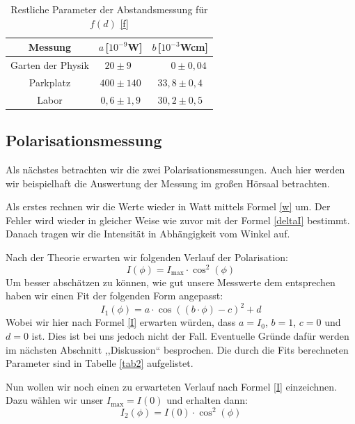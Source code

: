 \documentclass[titlepage,11pt,a4paper,ngerman]{article}
\newcommand{\tx}[1]{\textrm{#1}}
\begin{document}
\begin{table}[ht]
	\centering
	\caption{Restliche Parameter der Abstandsmessung für $f(d)$ \eqref{f}}
	\begin{tabular*}{.95\textwidth}{@{\extracolsep{\fill}}ccc}
		\toprule
		Messung & $a\,$[$ 10^{-9} $W] & $b\,$[$ 10^{-3} $Wcm] \\
		\midrule
		Garten der Physik & $20\pm9 \phantom{0}$ & $\phantom{0.00}0\pm0{,}04$ \\
		Parkplatz & $400\pm140$ & $33{,}8\pm0{,}4$\\
		Labor & $0{,}6\pm1{,}9$ & $30{,}2\pm0{,}5$ \\
		\bottomrule
	\end{tabular*}
	\label{tab1}
\end{table}

\FloatBarrier

\subsection{Polarisationsmessung}

Als nächstes betrachten wir die zwei Polarisationsmessungen. Auch hier werden wir beispielhaft die Auswertung der Messung im großen Hörsaal betrachten. \par 
Als erstes rechnen wir die Werte wieder in Watt mittels Formel \eqref{w} um. Der Fehler wird wieder in gleicher Weise wie zuvor mit der Formel \eqref{deltaI} bestimmt. Danach tragen wir die Intensität in Abhängigkeit vom Winkel auf. \par 
Nach der Theorie erwarten wir folgenden Verlauf der Polarisation:
\begin{equation}
I(\phi) = I_{\tx{max}}\cdot \cos^{2}(\phi)
\label{I}
\end{equation}
Um besser abschätzen zu können, wie gut unsere Messwerte dem entsprechen haben wir einen Fit der folgenden Form angepasst:
\begin{equation}
I_{1}(\phi) = a \cdot \cos((b \cdot\phi) - c)^{2} + d
\label{I1}
\end{equation}
Wobei wir hier nach Formel \eqref{I} erwarten würden, dass $a=I_{0}$, $b=1$, $c=0$ und $d=0$ ist. Dies ist bei uns jedoch nicht der Fall. Eventuelle Gründe dafür werden im nächsten Abschnitt ,,Diskussion`` besprochen. Die durch die Fits berechneten Parameter sind in Tabelle \ref{tab2} aufgelistet.\par
Nun wollen wir noch einen zu erwarteten Verlauf nach Formel \eqref{I} einzeichnen. Dazu wählen wir unser $I_{\tx{max}}=I(0)$ und erhalten dann:
\begin{equation}
I_{2}(\phi) = I(0)\cdot \cos^{2}(\phi)
\label{I2}
\end{equation}
\end{document}
